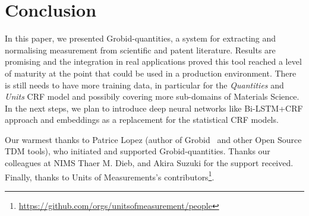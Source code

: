 \documentclass[sigconf]{acmart}
\begin{document}
\section{Conclusion}
\label{sec:conclusion}
In this paper, we presented Grobid-quantities, a system for extracting and normalising measurement from scientific and patent literature. Results are promising and the integration in real applications proved this tool reached a level of maturity at the point that could be used in a production environment. There is still needs to have more training data, in particular for the \textit{Quantities} and \textit{Units} CRF model and possibily covering more sub-domains of Materials Science. In the next steps, we plan to introduce deep neural networks like Bi-LSTM+CRF approach and embeddings as a replacement for the statistical CRF models. 

\begin{acks}
Our warmest thanks to Patrice Lopez (author of Grobid~\cite{GROBID} and other Open Source TDM tools), who initiated and supported Grobid-quantities. Thanks our colleagues at NIMS Thaer M. Dieb, and Akira Suzuki for the support received. Finally, thanks to Units of Measurements's contributors\footnote{\url{https://github.com/orgs/unitsofmeasurement/people}}.
\end{acks}




\end{document}
